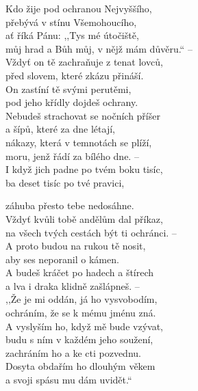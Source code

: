 \begin{translatioMulticol}{2}
Kdo žije pod ochranou Nejvyššího,~\grestar{}\\
přebývá v stínu Všemohoucího,\\
ať říká Pánu: ,,Tys mé útočiště,~\grestar{}\\
můj hrad a Bůh můj, v nějž mám důvěru.`` –\\
Vždyť on tě zachraňuje z tenat lovců,~\grestar{}\\
před slovem, které zkázu přináší.\\
On zastíní tě svými perutěmi,~\grestar{}\\
pod jeho křídly dojdeš ochrany.\\
Nebudeš strachovat se nočních příšer~\grestar{}\\
a šípů, které za dne létají,\\
nákazy, která v temnotách se plíží,~\grestar{}\\
moru, jenž řádí za bílého dne. –\\
I když jich padne po tvém boku tisíc,~\grestar{}\\
ba deset tisíc po tvé pravici,\columnbreak

záhuba přesto tebe nedosáhne.\\
Vždyť kvůli tobě andělům dal příkaz,~\grestar{}\\
na všech tvých cestách být ti ochránci. –\\
A proto budou na rukou tě nosit,~\grestar{}\\
aby ses neporanil o kámen.\\
A budeš kráčet po hadech a štírech~\grestar{}\\
a lva i draka klidně zašlápneš. –\\
,,Že je mi oddán, já ho vysvobodím,~\grestar{}\\
ochráním, že se k mému jménu zná.\\
A vyslyším ho, když mě bude vzývat,~\gredagger{}\\
budu s ním v každém jeho soužení,~\grestar{}\\
zachráním ho a ke cti pozvednu.\\
Dosyta obdařím ho dlouhým věkem~\grestar{}\\
a svoji spásu mu dám uvidět.``
\end{translatioMulticol}
